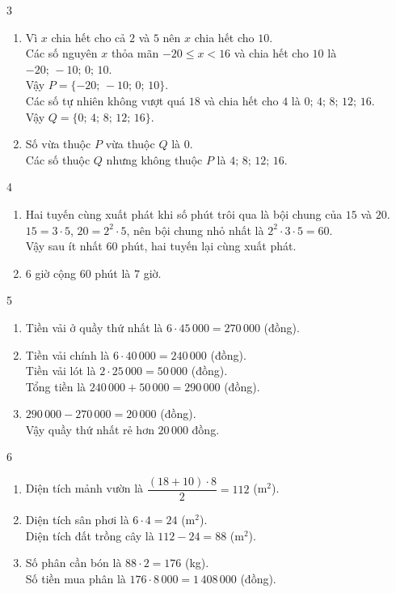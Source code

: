 \begin{Solbook}{3}
 \par \noindent  \begin {enumerate} \item Vì $x$ chia hết cho cả $2$ và $5$ nên $x$ chia hết cho $10$.\\ Các số nguyên $x$ thỏa mãn $-20\le x<16$ và chia hết cho $10$ là $-20;\,-10;\,0;\,10$.\\ Vậy $P=\{-20;\,-10;\,0;\,10\}$.\\ Các số tự nhiên không vượt quá $18$ và chia hết cho $4$ là $0;\,4;\,8;\,12;\,16$.\\ Vậy $Q=\{0;\,4;\,8;\,12;\,16\}$. \item Số vừa thuộc $P$ vừa thuộc $Q$ là $0$.\\ Các số thuộc $Q$ nhưng không thuộc $P$ là $4;\,8;\,12;\,16$. \end {enumerate}  \hfill \qedEX 
\end{Solbook}
\begin{Solbook}{4}
 \par \noindent  \begin {enumerate} \item Hai tuyến cùng xuất phát khi số phút trôi qua là bội chung của $15$ và $20$.\\ $15=3\cdot 5$, $20=2^{2}\cdot 5$, nên bội chung nhỏ nhất là $2^{2}\cdot 3\cdot 5=60$.\\ Vậy sau ít nhất $60$ phút, hai tuyến lại cùng xuất phát. \item $6$ giờ cộng $60$ phút là $7$ giờ. \end {enumerate}  \hfill \qedEX 
\end{Solbook}
\begin{Solbook}{5}
 \par \noindent  \begin {enumerate} \item Tiền vải ở quầy thứ nhất là $6\cdot 45\,000=270\,000$ (đồng). \item Tiền vải chính là $6\cdot 40\,000=240\,000$ (đồng).\\ Tiền vải lót là $2\cdot 25\,000=50\,000$ (đồng).\\ Tổng tiền là $240\,000+50\,000=290\,000$ (đồng). \item $290\,000-270\,000=20\,000$ (đồng).\\ Vậy quầy thứ nhất rẻ hơn $20\,000$ đồng. \end {enumerate}  \hfill \qedEX 
\end{Solbook}
\begin{Solbook}{6}
 \par \noindent  \begin {enumerate} \item Diện tích mảnh vườn là $\dfrac {(18+10)\cdot 8}{2}=112$ (m$^{2}$). \item Diện tích sân phơi là $6\cdot 4=24$ (m$^{2}$).\\ Diện tích đất trồng cây là $112-24=88$ (m$^{2}$). \item Số phân cần bón là $88\cdot 2=176$ (kg).\\ Số tiền mua phân là $176\cdot 8\,000=1\,408\,000$ (đồng). \end {enumerate}  \hfill \qedEX 
\end{Solbook}

